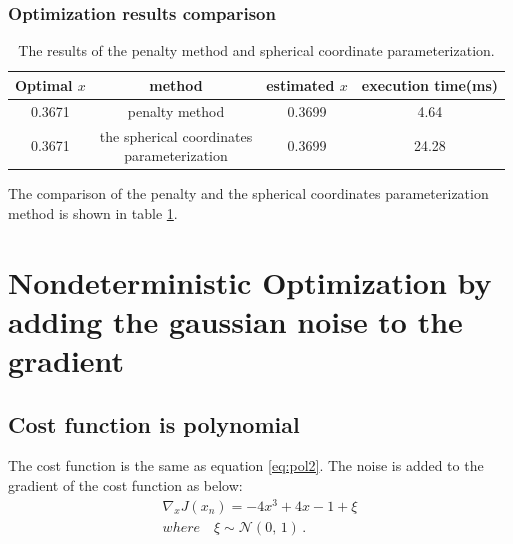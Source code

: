\documentclass[a4paper,12pt]{article}
\begin{document}
\subsubsection{Optimization results comparison}


\begin{table}[!ht]
\begin{center}
\begin{tabular}{|c|c|c|c|}
\hline
Optimal $x$& method & estimated $x$&execution time(ms)\\
\hline
0.3671& penalty method&0.3699&4.64\\
\hline
0.3671&  \makecell{ the spherical coordinates \\parameterization}&0.3699&24.28\\

\hline
\end{tabular}
\end{center}
\caption{The results of the penalty method and spherical coordinate parameterization.}
\label{tab:exp}
\end{table}


The comparison of the penalty and the spherical coordinates parameterization method is shown in table \ref{tab:exp}. \\
\section{Nondeterministic Optimization by adding the gaussian noise to the gradient}
\subsection{Cost function is polynomial }
The cost function is the same as equation \ref{eq:pol2}. The noise is added to the gradient of the cost function as below:\\
\begin{equation}\label{eq:pena_poly_noise}
\begin{aligned}
\nabla _x J(x_n) = -4x^3+4x-1+\xi\\
where \quad \xi \sim \mathcal{N}(0,\,1)\,.\\
\end{aligned}
\end{equation}
\end{document}
